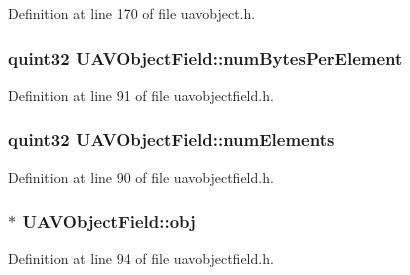 \-Definition at line 170 of file uavobject.\-h.

\hypertarget{group___u_a_v_objects_plugin_gaed675e1711f18b1ab737f9e8e55dca35}{
\subsubsection[{num\-Bytes\-Per\-Element}]{\setlength{\rightskip}{0pt plus 5cm}quint32 {\bf \-U\-A\-V\-Object\-Field\-::num\-Bytes\-Per\-Element}}}\label{group___u_a_v_objects_plugin_gaed675e1711f18b1ab737f9e8e55dca35}


\-Definition at line 91 of file uavobjectfield.\-h.

\hypertarget{group___u_a_v_objects_plugin_gaa82f6e1f5deca501c58b45d902be0ef4}{
\subsubsection[{num\-Elements}]{\setlength{\rightskip}{0pt plus 5cm}quint32 {\bf \-U\-A\-V\-Object\-Field\-::num\-Elements}}}\label{group___u_a_v_objects_plugin_gaa82f6e1f5deca501c58b45d902be0ef4}


\-Definition at line 90 of file uavobjectfield.\-h.

\hypertarget{group___u_a_v_objects_plugin_ga750b9ade4270026bd2d02d37468597b5}{
\subsubsection[{obj}]{$\ast$ {\bf \-U\-A\-V\-Object\-Field\-::obj}}}\label{group___u_a_v_objects_plugin_ga750b9ade4270026bd2d02d37468597b5}


\-Definition at line 94 of file uavobjectfield.\-h.

